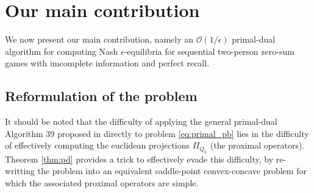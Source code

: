 \documentclass[12pt]{article}
\begin{document}
\section{Our main contribution}
\label{sec:algo}
We now present our main contribution, namely an $\mathcal{O}(1/\epsilon)$ primal-dual algorithm for computing Nash $\epsilon$-equilibria for sequential two-person zero-sum games with imcomplete information and perfect recall.

\subsection{Reformulation of the problem}
It should be noted that the difficulty of applying the general primal-dual Algorithm 39 proposed in \cite{chambolle2010} directly to problem \eqref{eq:primal_pb} lies in the difficulty of effectively computing the euclidean projections $\Pi_{Q_k}$ (the proximal operators). Theorem \ref{thm:pd} provides a trick to effectively evade this difficulty, by re-writting the problem into an equivalent saddle-point convex-concave problem for which the associated proximal operators are simple.
\end{document}
